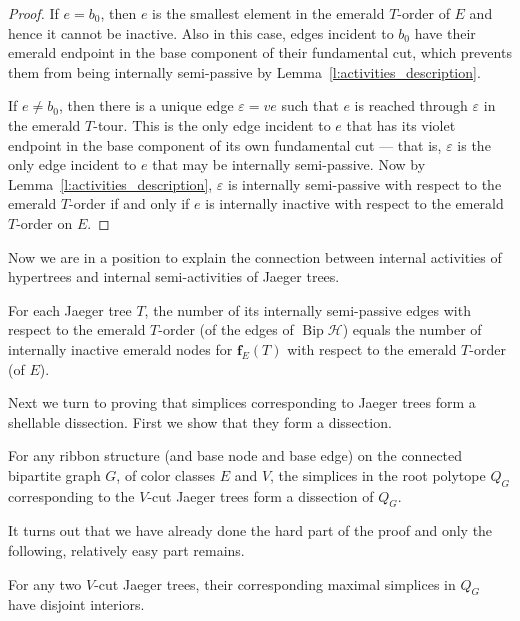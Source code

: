 \documentclass[ALCO,ThmDefs,Unicode,epreuves]{cedram}
\newcommand{\HH}{\mathcal H}
\DeclareMathOperator{\bip}{Bip}
\begin{document}
\begin{proof}
If $e=b_0$, then $e$ is the smallest element in the emerald $T$-order of $E$ and hence it cannot be inactive. Also in this case, edges incident to $b_0$ have their emerald endpoint in the base component of their fundamental cut, which prevents them from being internally semi-passive by Lemma~\ref{l:activities_description}.

If $e\neq b_0$, then there is a unique edge $\varepsilon=ve$ such that $e$ is reached through $\varepsilon$ in the emerald $T$-tour. This is the only edge incident to $e$ that has its violet endpoint in the base component of its own fundamental cut --- that is, $\varepsilon$ is the only edge incident to $e$ that may be internally semi-passive. Now by Lemma~\ref{l:activities_description}, $\varepsilon$ is internally semi-passive with respect to the emerald $T$-order if and only if $e$ is internally inactive with respect to the emerald $T$-order on $E$.
\end{proof}

Now we are in a position to explain the connection between internal activities of hypertrees and internal semi-activities of Jaeger trees.

\begin{coro}\label{cor:passziv_szemipassziv}
For each Jaeger tree $T$, the number of its internally semi-passive edges with respect to the emerald $T$-order (of the edges of $\bip\HH$) equals the number of internally inactive emerald nodes for $\mathbf f_E(T)$ with respect to the emerald $T$-order (of $E$).
\end{coro}

Next we turn to proving that simplices corresponding to Jaeger trees form a shellable dissection. First we show that they form a dissection. 

\begin{theo}\label{t:J-trees_form_quasitr}
For any ribbon structure (and base node and base edge) on the connected bipartite graph $G$, of color classes $E$ and $V$, the simplices in the root polytope $Q_G$ corresponding to the $V$-cut Jaeger trees form a dissection of $Q_G$.
\end{theo}

It turns out that we have already done the hard part of the proof and only the following, relatively easy part remains.

\begin{lemma}\label{lem:disjoint}
	For any two $V$-cut Jaeger trees, their corresponding maximal simplices in $Q_G$ have disjoint interiors.
\end{lemma}
\end{document}
